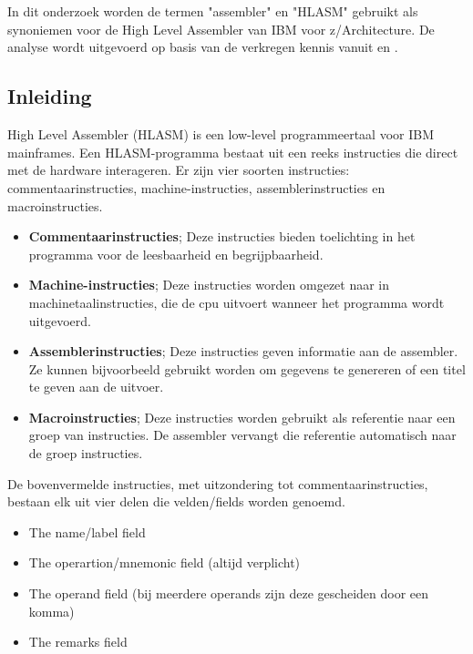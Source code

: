 \chapter{}%
\label{ch:hlasmanalyse}

In dit onderzoek worden de termen "assembler" en "HLASM" gebruikt als synoniemen voor de High Level Assembler van IBM voor z/Architecture. De analyse wordt uitgevoerd op basis van de verkregen kennis vanuit \textcite{ehrman_2001} en \textcite{hlasm_language_reference}. 

\section{Inleiding}

High Level Assembler (HLASM) is een low-level programmeertaal voor IBM mainframes. Een HLASM-programma bestaat uit een reeks instructies die direct met de hardware interageren. Er zijn vier soorten instructies: commentaarinstructies, machine-instructies, assemblerinstructies en macroinstructies. 

\begin{itemize}
    \item \textbf{Commentaarinstructies}; 
        Deze instructies bieden toelichting in het programma voor de leesbaarheid en begrijpbaarheid. 
    \item \textbf{Machine-instructies}; 
        Deze instructies worden omgezet naar in machinetaalinstructies, die de cpu uitvoert wanneer het programma wordt uitgevoerd. 
    \item \textbf{Assemblerinstructies};  
        Deze instructies geven informatie aan de assembler. Ze kunnen bijvoorbeeld gebruikt worden om gegevens te genereren of een titel te geven aan de uitvoer. 
    \item \textbf{Macroinstructies}; 
        Deze instructies worden gebruikt als referentie naar een groep van instructies. De assembler vervangt die referentie automatisch naar de groep instructies. 
\end{itemize}

\newpage

De bovenvermelde instructies, met uitzondering tot commentaarinstructies, bestaan elk uit vier delen die velden/fields worden genoemd. 

\begin{itemize}
    \item The name/label field 
    \item The operartion/mnemonic field (altijd verplicht)
    \item The operand field (bij meerdere operands zijn deze gescheiden door een komma)
    \item The remarks field
\end{itemize}

